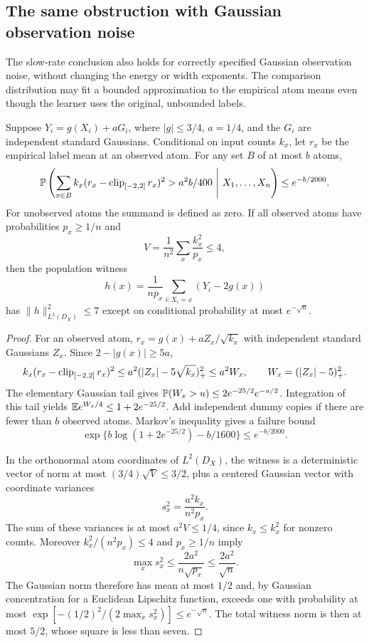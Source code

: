 \subsection{The same obstruction with Gaussian observation noise}
\label{sec:gaussian-noise-rate}
The slow-rate conclusion also holds for correctly specified Gaussian observation noise, without changing the energy or width exponents. The comparison distribution may fit a bounded approximation to the empirical atom means even though the learner uses the original, unbounded labels.

\begin{lemma}
\label{lem:gaussian-clipped-comparison}
Suppose $Y_i=g(X_i)+aG_i$, where $|g|\le3/4$, $a=1/4$, and the $G_i$ are independent standard Gaussians. Conditional on input counts $k_x$, let $r_x$ be the empirical label mean at an observed atom. For any set $B$ of at most $b$ atoms,
\[
 \mathbb P\left(\sum_{x\in B}k_x(r_x-\operatorname{clip}_{[-2,2]}r_x)^2
       >a^2b/400\ \middle|\ X_1,\ldots,X_n\right)
 \le e^{-b/2000}.
\]
For unobserved atoms the summand is defined as zero. If all observed atoms have probabilities $p_x\ge1/n$ and
\[
 V=\frac1{n^2}\sum_x\frac{k_x^2}{p_x}\le4,
\]
then the population witness
\[
 h(x)=\frac1{np_x}\sum_{i:X_i=x}(Y_i-2g(x))
\]
has $\|h\|_{L^2(D_X)}^2\le7$ except on conditional probability at most $e^{-\sqrt n}$.
\end{lemma}
\begin{proof}
For an observed atom, $r_x=g(x)+aZ_x/\sqrt{k_x}$ with independent standard Gaussians $Z_x$. Since $2-|g(x)|\ge5a$,
\[
 k_x(r_x-\operatorname{clip}_{[-2,2]}r_x)^2
 \le a^2(|Z_x|-5\sqrt{k_x})_+^2
 \le a^2W_x,\qquad W_x=(|Z_x|-5)_+^2.
\]
The elementary Gaussian tail gives
$\mathbb P(W_x>u)\le2e^{-25/2}e^{-u/2}$. Integration of this tail yields
$\mathbb E e^{W_x/4}\le1+2e^{-25/2}$. Add independent dummy copies if there are fewer than $b$ observed atoms. Markov's inequality gives a failure bound
\[
 \exp\{b\log(1+2e^{-25/2})-b/1600\}\le e^{-b/2000}.
\]

In the orthonormal atom coordinates of $L^2(D_X)$, the witness is a deterministic vector of norm at most $(3/4)\sqrt V\le3/2$, plus a centered Gaussian vector with coordinate variances
\[
 s_x^2=\frac{a^2k_x}{n^2p_x}.
\]
The sum of these variances is at most $a^2V\le1/4$, since $k_x\le k_x^2$ for nonzero counts. Moreover $k_x^2/(n^2p_x)\le4$ and $p_x\ge1/n$ imply
\[
 \max_xs_x^2\le\frac{2a^2}{n\sqrt{p_x}}\le\frac{2a^2}{\sqrt n}.
\]
The Gaussian norm therefore has mean at most $1/2$ and, by Gaussian concentration for a Euclidean Lipschitz function, exceeds one with probability at most
$\exp[-(1/2)^2/(2\max_xs_x^2)]\le e^{-\sqrt n}$.
The total witness norm is then at most $5/2$, whose square is less than seven.
\end{proof}

